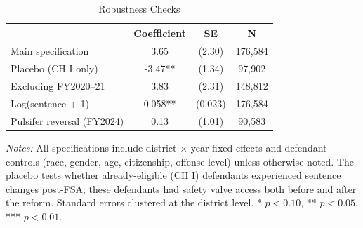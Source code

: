 \begin{table}[H]
\centering
\caption{Robustness Checks}
\label{tab:robust}
\begin{threeparttable}
\begin{tabular}{lccc}
\toprule
 & Coefficient & SE & N \\
\midrule
Main specification & 3.65 & (2.30) & 176,584 \\
Placebo (CH I only) & -3.47** & (1.34) & 97,902 \\
Excluding FY2020--21 & 3.83 & (2.31) & 148,812 \\
Log(sentence + 1) & 0.058** & (0.023) & 176,584 \\
Pulsifer reversal (FY2024) & 0.13 & (1.01) & 90,583 \\
\bottomrule
\end{tabular}
\begin{tablenotes}[flushleft]
\small
\item \textit{Notes:} All specifications include district $\times$ year fixed effects and defendant controls (race, gender, age, citizenship, offense level) unless otherwise noted. The placebo tests whether already-eligible (CH I) defendants experienced sentence changes post-FSA; these defendants had safety valve access both before and after the reform. Standard errors clustered at the district level. * $p<0.10$, ** $p<0.05$, *** $p<0.01$.
\end{tablenotes}
\end{threeparttable}
\end{table}
